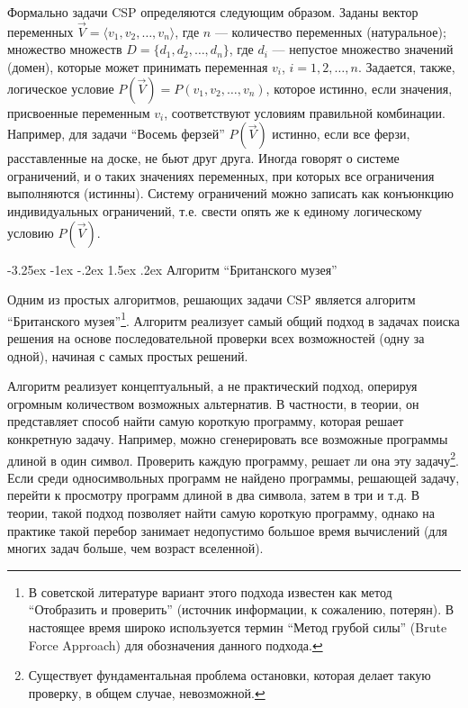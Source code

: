 \documentclass[12pt, openany, twoside]{book} %
\makeatletter
\renewcommand\section{\@startsection {section}{1}{\z@}%
                                   {-3.25ex \@plus -1ex \@minus -.2ex}%
                                   {1.5ex \@plus.2ex}%
                                   {\normalfont\large\bfseries}}
\makeatother
\begin{document}
Формально задачи CSP определяются следующим образом. Заданы вектор переменных $\vec{V}=\langle v_1, v_2, \ldots, v_n\rangle$, где $n$ --- количество переменных (натуральное); множество множеств $D=\{ d_1, d_2, \ldots, d_n\}$, где $d_i$ --- непустое множество значений (домен), которые может принимать переменная $v_i$, $i=1,2,\ldots,n$. Задается, также, логическое условие $P(\vec{V})=P(v_1,v_2,\ldots,v_n)$, которое истинно, если значения, присвоенные переменным $v_i$, соответствуют условиям правильной комбинации. Например, для задачи ``Восемь ферзей'' $P(\vec{V})$ истинно, если все ферзи, расставленные на доске, не бьют друг друга. Иногда говорят о системе ограничений, и о таких значениях переменных, при которых все ограничения выполняются (истинны). Систему ограничений можно записать как конъюнкцию индивидуальных ограничений, т.е. свести опять же к единому логическому условию $P(\vec{V})$.

\section{Алгоритм ``Британского музея''}

Одним из простых алгоритмов, решающих задачи CSP является алгоритм ``Британского музея''\footnote{В советской литературе вариант этого подхода известен как метод ``Отобразить и проверить'' (источник информации, к сожалению, потерян). В настоящее время широко используется термин ``Метод грубой силы'' (Brute Force Approach) для обозначения данного подхода.}. Алгоритм реализует самый общий подход в задачах поиска решения на основе последовательной проверки всех возможностей (одну за одной), начиная с самых простых решений.

Алгоритм реализует концептуальный, а не практический подход, оперируя огромным количеством возможных альтернатив. В частности, в теории, он представляет способ найти самую короткую программу, которая решает конкретную задачу. Например, можно сгенерировать все возможные программы длиной в один символ. Проверить каждую программу, решает ли она эту задачу\footnote{Существует фундаментальная проблема остановки, которая делает такую проверку, в общем случае, невозможной.}. Если среди односимвольных программ не найдено программы, решающей задачу, перейти к просмотру программ длиной в два символа, затем в три и т.д. В теории, такой подход позволяет найти самую короткую программу, однако на практике такой перебор занимает недопустимо большое время вычислений (для многих задач больше, чем возраст вселенной).
\end{document}
